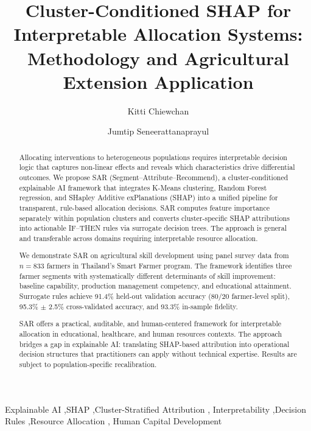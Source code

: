 \documentclass[3p,twocolumn,authoryear]{elsarticle}
\begin{document}
\begin{frontmatter}

\title{Cluster-Conditioned SHAP for Interpretable Allocation Systems:
       Methodology and Agricultural Extension Application}

\author[inst1]{Kitti Chiewchan}
\author[inst2]{Jumtip Seneerattanaprayul}

\address[inst1]{Computer Education Program, Faculty of Education,
  Bansomdejchaopraya Rajabhat University,
  1061 Issaraphap Road, Hirunrujee, Thonburi, Bangkok 10600, Thailand}
\address[inst2]{Department of Agricultural and Resource Economics,
  Faculty of Economics, Kasetsart University,
  50 Ngam Wong Wan Road, Ladyao, Jatujak, Bangkok 10110, Thailand}

\begin{abstract}
Allocating interventions to heterogeneous populations requires interpretable decision logic that captures non-linear effects and reveals which characteristics drive differential outcomes. We propose SAR (Segment--Attribute--Recommend), a cluster-conditioned explainable AI framework that integrates K-Means clustering, Random Forest regression, and SHapley Additive exPlanations (SHAP) into a unified pipeline for transparent, rule-based allocation decisions. SAR computes feature importance separately within population clusters and converts cluster-specific SHAP attributions into actionable IF--THEN rules via surrogate decision trees. The approach is general and transferable across domains requiring interpretable resource allocation.

We demonstrate SAR on agricultural skill development using panel survey data from $n=833$ farmers in Thailand's Smart Farmer program. The framework identifies three farmer segments with systematically different determinants of skill improvement: baseline capability, production management competency, and educational attainment. Surrogate rules achieve 91.4\% held-out validation accuracy (80/20 farmer-level split), 95.3\% $\pm$ 2.5\% cross-validated accuracy, and 93.3\% in-sample fidelity.

SAR offers a practical, auditable, and human-centered framework for interpretable allocation in educational, healthcare, and human resources contexts. The approach bridges a gap in explainable AI: translating SHAP-based attribution into operational decision structures that practitioners can apply without technical expertise. Results are subject to population-specific recalibration.
\end{abstract}

\begin{keyword}
Explainable AI \sep SHAP \sep Cluster-Stratified Attribution \sep 
Interpretability \sep Decision Rules \sep Resource Allocation \sep 
Human Capital Development
\end{keyword}

\end{frontmatter}
\end{document}
